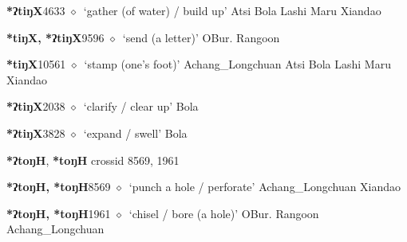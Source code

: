   \begin{list}{}{\leftmargin=1.5em \itemindent=-1.5em}
  \item {\footnotesize \textbf{*ʔtiŋX}}{\tiny 4633}
         $\diamond$~`gather (of water) / build up'
         Atsi 
\hspace{1ex}
         Bola 
\hspace{1ex}
         Lashi 
\hspace{1ex}
         Maru 
\hspace{1ex}
         Xiandao 
  \item {\footnotesize \textbf{*tiŋX, *ʔtiŋX}}{\tiny 9596}
\hspace{1ex}
         $\diamond$~`send (a letter)'
         OBur. 
\hspace{1ex}
         Rangoon 
  \item {\footnotesize \textbf{*tiŋX}}{\tiny 10561}
\hspace{1ex}
         $\diamond$~`stamp (one's foot)'
         Achang\_Longchuan 
\hspace{1ex}
         Atsi 
\hspace{1ex}
         Bola 
\hspace{1ex}
         Lashi 
\hspace{1ex}
         Maru 
\hspace{1ex}
         Xiandao 
  \item {\footnotesize \textbf{*ʔtiŋX}}{\tiny 2038}
\hspace{1ex}
         $\diamond$~`clarify / clear up'
         Bola 
  \item {\footnotesize \textbf{*ʔtiŋX}}{\tiny 3828}
\hspace{1ex}
         $\diamond$~`expand / swell'
         Bola 
  \end{list}
\item
\textbf{*ʔtoŋH}, \textbf{*toŋH}
  {\tiny crossid 8569, 1961}
  \begin{list}{}{\leftmargin=1.5em \itemindent=-1.5em}
  \item {\footnotesize \textbf{*ʔtoŋH, *toŋH}}{\tiny 8569}
         $\diamond$~`punch a hole / perforate'
         Achang\_Longchuan 
\hspace{1ex}
         Xiandao 
  \item {\footnotesize \textbf{*ʔtoŋH, *toŋH}}{\tiny 1961}
\hspace{1ex}
         $\diamond$~`chisel / bore (a hole)'
         OBur. 
\hspace{1ex}
         Rangoon 
\hspace{1ex}
         Achang\_Longchuan 
  \end{list}
